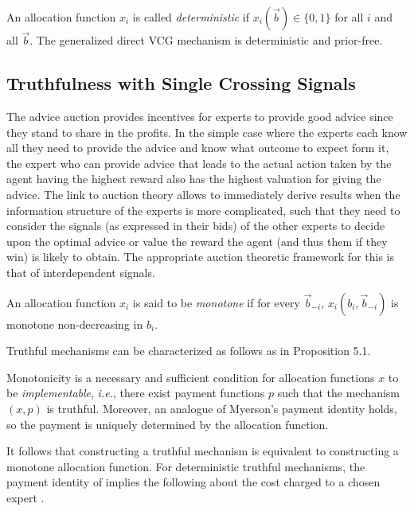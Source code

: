 An allocation function $x_i$ is called {\sl deterministic} if $x_i(\vec{b})\in \{0,1\}$ for all $i$ and all $\vec{b}$.
The generalized direct VCG mechanism is deterministic and prior-free.



\subsection{Truthfulness with Single Crossing Signals}

The advice auction provides incentives for experts to provide good advice since they stand to share in the profits. In the simple case where the experts each know all they need to provide the advice and know what outcome to expect form it, the expert who can provide advice that leads to the actual action taken by the agent having the highest reward also has the highest valuation for giving the advice. The link to auction theory allows to immediately derive results when the information structure of the experts is more complicated, such that they need to consider the signals (as expressed in their bids) of the other experts to decide upon the optimal advice or value the reward the agent (and thus them if they win) is likely to obtain. The appropriate auction theoretic framework for this is that of interdependent signals. 

\begin{defn}[Monotonicity]
	An allocation function $x_i$ is said to be \emph{monotone} if for every $\vec{b}_{-i}$, $x_i(b_i,\vec{b}_{-i})$ is monotone non-decreasing in $b_i$.
\end{defn}

Truthful mechanisms can be characterized as follows as in \citet{roughgarden2016optimal} Proposition 5.1.

\begin{prop}\label{prop:char-ic}
	Monotonicity is a necessary and sufficient condition for allocation functions $x$ to be \emph{implementable}, {\sl i.e.}, there exist payment functions $p$ such that the mechanism $(x,p)$ is truthful.  Moreover, an analogue of Myerson's payment identity holds, so the payment is uniquely determined by the allocation function.%
\end{prop}

It follows that constructing a truthful mechanism is equivalent to constructing a monotone allocation function.
For deterministic truthful mechanisms, the payment identity of \citet{roughgarden2016optimal} implies the following about the cost charged to a chosen expert  \citep{eden2018interdependent}.

